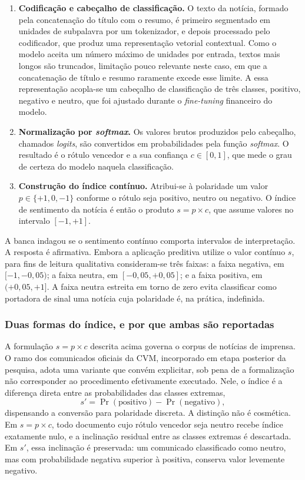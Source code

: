 \begin{enumerate}
    \item \textbf{Codificação e cabeçalho de classificação.} O texto da notícia, formado pela concatenação do título com o resumo, é primeiro segmentado em unidades de subpalavra por um tokenizador, e depois processado pelo codificador, que produz uma representação vetorial contextual. Como o modelo aceita um número máximo de unidades por entrada, textos mais longos são truncados, limitação pouco relevante neste caso, em que a concatenação de título e resumo raramente excede esse limite. A essa representação acopla-se um cabeçalho de classificação de três classes, positivo, negativo e neutro, que foi ajustado durante o \textit{fine-tuning} financeiro do modelo.
    \item \textbf{Normalização por \textit{softmax}.} Os valores brutos produzidos pelo cabeçalho, chamados \textit{logits}, são convertidos em probabilidades pela função \textit{softmax}. O resultado é o rótulo vencedor e a sua confiança $c \in [0,1]$, que mede o grau de certeza do modelo naquela classificação.
    \item \textbf{Construção do índice contínuo.} Atribui-se à polaridade um valor $p \in \{+1, 0, -1\}$ conforme o rótulo seja positivo, neutro ou negativo. O índice de sentimento da notícia é então o produto $s = p \times c$, que assume valores no intervalo $[-1, +1]$.
\end{enumerate}

A banca indagou se o sentimento contínuo comporta intervalos de interpretação. A resposta é afirmativa. Embora a aplicação preditiva utilize o valor contínuo $s$, para fins de leitura qualitativa consideram-se três faixas: a faixa negativa, em $[-1, -0{,}05)$; a faixa neutra, em $[-0{,}05, +0{,}05]$; e a faixa positiva, em $(+0{,}05, +1]$. A faixa neutra estreita em torno de zero evita classificar como portadora de sinal uma notícia cuja polaridade é, na prática, indefinida.

\subsubsection{Duas formas do índice, e por que ambas são reportadas}
\label{sec:duas_formas_ism}

A formulação $s = p \times c$ descrita acima governa o corpus de notícias de imprensa. O ramo dos comunicados oficiais da CVM, incorporado em etapa posterior da pesquisa, adota uma variante que convém explicitar, sob pena de a formalização não corresponder ao procedimento efetivamente executado. Nele, o índice é a diferença direta entre as probabilidades das classes extremas,
\begin{equation}
s' = \Pr(\text{positivo}) - \Pr(\text{negativo}),
\end{equation}
dispensando a conversão para polaridade discreta. A distinção não é cosmética. Em $s = p \times c$, todo documento cujo rótulo vencedor seja neutro recebe índice exatamente nulo, e a inclinação residual entre as classes extremas é descartada. Em $s'$, essa inclinação é preservada: um comunicado classificado como neutro, mas com probabilidade negativa superior à positiva, conserva valor levemente negativo.

